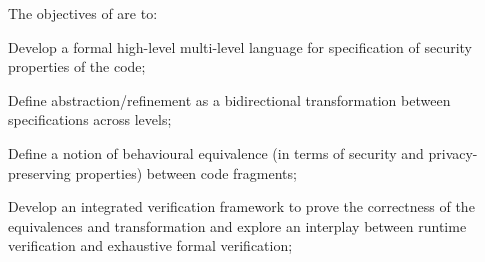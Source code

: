 \addtocounter{wpno}{1}
\begin{Workpackage}{\thewpno}
\WPTitle{\wpname{\thewpno}}


\begin{WPObjectives}
The objectives of \theWP{} are to:
\begin{compactitem}
\item Develop a formal high-level multi-level language for specification of security properties of the code; 

\item Define abstraction/refinement as a bidirectional transformation between specifications across levels;


\item Define a notion of behavioural equivalence (in terms of security and privacy-preserving properties) between code fragments;


\item Develop an integrated verification framework to prove the correctness of the equivalences and transformation and 
explore an interplay between runtime verification and exhaustive formal verification;


\end{compactitem}
\end{WPObjectives}
\end{Workpackage}
